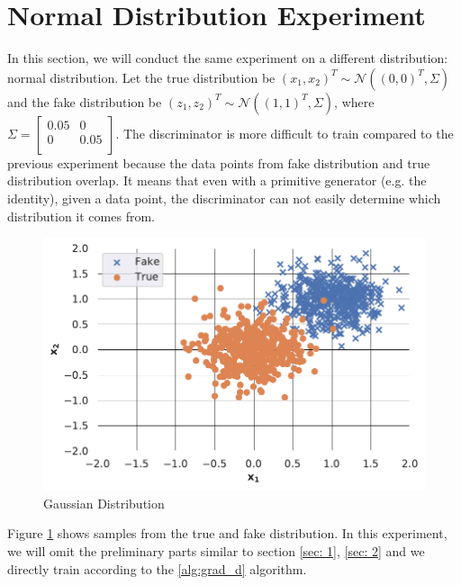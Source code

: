 \section{Normal Distribution Experiment}
In this section, we will conduct the same experiment on a different distribution: normal distribution. Let the true distribution be $(x_1,x_2)^T \sim \mathcal{N}\left((0,0)^T, \Sigma\right)$ and the fake distribution be $(z_1,z_2)^T \sim \mathcal{N}\left((1,1)^T, \Sigma\right)$, where $\Sigma = \begin{bmatrix}
0.05 & 0\\
0 & 0.05\\
\end{bmatrix}$. The discriminator is more difficult to train compared to the previous experiment because the data points from fake distribution and true distribution overlap. It means that even with a primitive generator (e.g. the identity), given a data point, the discriminator can not easily determine which distribution it comes from. 
\begin{figure}[H]
    \centering
    \includegraphics[width = 12cm]{Gaussian Distribution.pdf}
    \caption{Gaussian Distribution}
    \label{fig:gau}
\end{figure}
Figure \ref{fig:gau} shows samples from the true and fake distribution. In this experiment, we will omit the preliminary parts similar to section \ref{sec: 1}, \ref{sec: 2} and we directly train according to the \ref{alg:grad_d} algorithm.


